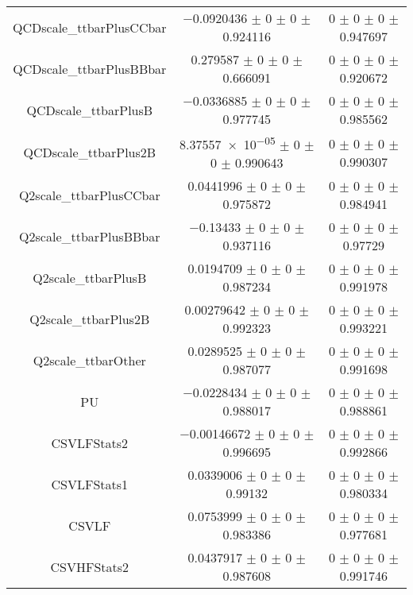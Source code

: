 \begin{table}
\begin{tabular}{ccc}
QCDscale\_ttbarPlusCCbar & \num{-0.0920436} $\pm$ \num{0} $\pm$ \num{0} $\pm$ \num{0.924116} & \num{0} $\pm$ \num{0} $\pm$ \num{0} $\pm$ \num{0.947697}\\
QCDscale\_ttbarPlusBBbar & \num{0.279587} $\pm$ \num{0} $\pm$ \num{0} $\pm$ \num{0.666091} & \num{0} $\pm$ \num{0} $\pm$ \num{0} $\pm$ \num{0.920672}\\
QCDscale\_ttbarPlusB & \num{-0.0336885} $\pm$ \num{0} $\pm$ \num{0} $\pm$ \num{0.977745} & \num{0} $\pm$ \num{0} $\pm$ \num{0} $\pm$ \num{0.985562}\\
QCDscale\_ttbarPlus2B & \num{8.37557e-05} $\pm$ \num{0} $\pm$ \num{0} $\pm$ \num{0.990643} & \num{0} $\pm$ \num{0} $\pm$ \num{0} $\pm$ \num{0.990307}\\
Q2scale\_ttbarPlusCCbar & \num{0.0441996} $\pm$ \num{0} $\pm$ \num{0} $\pm$ \num{0.975872} & \num{0} $\pm$ \num{0} $\pm$ \num{0} $\pm$ \num{0.984941}\\
Q2scale\_ttbarPlusBBbar & \num{-0.13433} $\pm$ \num{0} $\pm$ \num{0} $\pm$ \num{0.937116} & \num{0} $\pm$ \num{0} $\pm$ \num{0} $\pm$ \num{0.97729}\\
Q2scale\_ttbarPlusB & \num{0.0194709} $\pm$ \num{0} $\pm$ \num{0} $\pm$ \num{0.987234} & \num{0} $\pm$ \num{0} $\pm$ \num{0} $\pm$ \num{0.991978}\\
Q2scale\_ttbarPlus2B & \num{0.00279642} $\pm$ \num{0} $\pm$ \num{0} $\pm$ \num{0.992323} & \num{0} $\pm$ \num{0} $\pm$ \num{0} $\pm$ \num{0.993221}\\
Q2scale\_ttbarOther & \num{0.0289525} $\pm$ \num{0} $\pm$ \num{0} $\pm$ \num{0.987077} & \num{0} $\pm$ \num{0} $\pm$ \num{0} $\pm$ \num{0.991698}\\
PU & \num{-0.0228434} $\pm$ \num{0} $\pm$ \num{0} $\pm$ \num{0.988017} & \num{0} $\pm$ \num{0} $\pm$ \num{0} $\pm$ \num{0.988861}\\
CSVLFStats2 & \num{-0.00146672} $\pm$ \num{0} $\pm$ \num{0} $\pm$ \num{0.996695} & \num{0} $\pm$ \num{0} $\pm$ \num{0} $\pm$ \num{0.992866}\\
CSVLFStats1 & \num{0.0339006} $\pm$ \num{0} $\pm$ \num{0} $\pm$ \num{0.99132} & \num{0} $\pm$ \num{0} $\pm$ \num{0} $\pm$ \num{0.980334}\\
CSVLF & \num{0.0753999} $\pm$ \num{0} $\pm$ \num{0} $\pm$ \num{0.983386} & \num{0} $\pm$ \num{0} $\pm$ \num{0} $\pm$ \num{0.977681}\\
CSVHFStats2 & \num{0.0437917} $\pm$ \num{0} $\pm$ \num{0} $\pm$ \num{0.987608} & \num{0} $\pm$ \num{0} $\pm$ \num{0} $\pm$ \num{0.991746}\\

\end{tabular}
\end{table}
